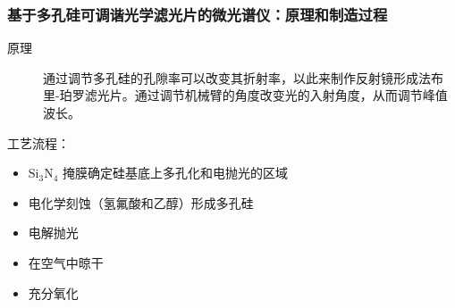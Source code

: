 \begin{frame}[c]
    \frametitle{基于多孔硅可调谐光学滤光片的微光谱仪：原理和制造过程}
    \begin{description}
        \item[原理] 通过调节多孔硅的孔隙率可以改变其折射率，以此来制作反射镜形成法布里-珀罗滤光片。通过调节机械臂的角度改变光的入射角度，从而调节峰值波长。
    \end{description}

    工艺流程：
    \begin{itemize}
        \item $\mathrm{Si}_3\mathrm{N}_4$ 掩膜确定硅基底上多孔化和电抛光的区域
        \item 电化学刻蚀（氢氟酸和乙醇）形成多孔硅
        \item 电解抛光
        \item 在空气中晾干
        \item 充分氧化
    \end{itemize}


\end{frame}

